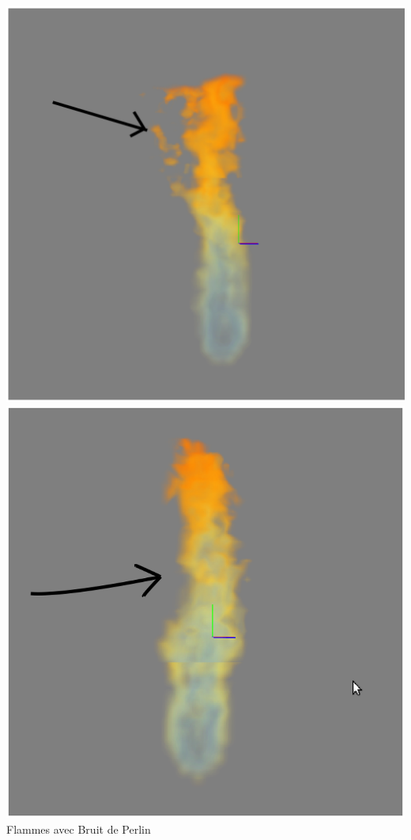 \documentclass[a4paper,10pt]{article}
\begin{document}
\begin{center}
\includegraphics[scale=0.5]{Perlin1.ps}
\includegraphics[scale=0.5]{Perlin2.ps}\\
Flammes avec Bruit de Perlin\\
\end{center}
\end{document}
